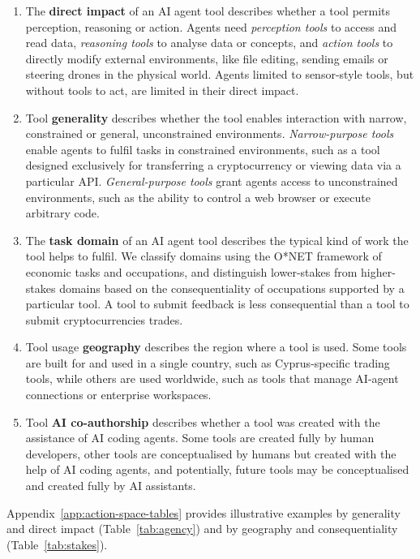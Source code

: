 \documentclass[manuscript,screen,nonacm,oneside]{acmart}
\begin{document}
\begin{enumerate}
\def\labelenumi{\arabic{enumi}.}
\item
  The \textbf{direct impact} of an AI agent tool describes whether a tool permits perception, reasoning or action. Agents need \emph{perception tools} to access and read data, \emph{reasoning tools} to analyse data or concepts, and \emph{action tools} to directly modify external environments, like file editing, sending emails or steering drones in the physical world. Agents limited to sensor-style tools, but without tools to act, are limited in their direct impact.

\item 
  Tool \textbf{generality} describes whether the tool enables interaction with narrow, constrained or general, unconstrained environments. \emph{Narrow-purpose tools} enable agents to fulfil tasks in constrained environments, such as a tool designed exclusively for transferring a cryptocurrency or viewing data via a particular API. \emph{General-purpose tools} grant agents access to unconstrained environments, such as the ability to control a web browser or execute arbitrary code. 

\item 
  The \textbf{task domain} of an AI agent tool describes the typical kind of work the tool helps to fulfil. We classify domains using the O*NET framework of economic tasks and occupations, and distinguish lower-stakes from higher-stakes domains based on the consequentiality of occupations supported by a particular tool. A tool to submit feedback is less consequential than a tool to submit cryptocurrencies trades. 

\item 
  Tool usage \textbf{geography} describes the region where a tool is used. Some tools are built for and used in a single country, such as Cyprus-specific trading tools, while others are used worldwide, such as tools that manage AI-agent connections or enterprise workspaces.

\item
  Tool \textbf{AI co-authorship} describes whether a tool was created with the assistance of AI coding agents. Some tools are created fully by human developers, other tools are conceptualised by humans but created with the help of AI coding agents, and potentially, future tools may be conceptualised and created fully by AI assistants.
\end{enumerate}

Appendix~\ref{app:action-space-tables} provides illustrative examples by generality and direct impact (Table~\ref{tab:agency}) and by geography and consequentiality (Table~\ref{tab:stakes}).
\end{document}
